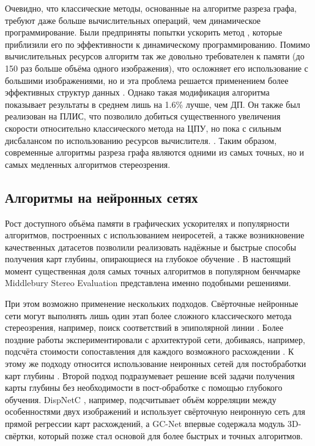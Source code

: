 Очевидно, что классические методы, основанные на алгоритме разреза графа, требуют даже больше вычислительных операций, чем динамическое программирование. Были предприняты попытки ускорить метод \cite{fast_gc,graphcut}, 
которые приблизили его по эффективности к динамическому программированию. Помимо вычислительных ресурсов алгоритм так же довольно требователен к памяти (до  150 раз больше объёма одного изображения), что осложняет его использование 
с большими изображениями, но и эта проблема решается применением более эффективных структур данных \cite{effic_gc}. Однако такая модификация алгоритма показывает результаты в среднем лишь на 1.6\%  лучше, чем ДП. Он также был реализован 
на ПЛИС, что позволило добиться существенного увеличения скорости относительно классического метода на ЦПУ, но пока с сильным дисбалансом по использованию ресурсов вычислителя. \cite{fpga_gc}.  
Таким образом, современные алгоритмы разреза графа являются одними из самых точных, но и самых медленных алгоритмов стереозрения. 

\subsection{Алгоритмы на нейронных сетях}

Рост доступного объёма памяти в графических ускорителях и популярности алгоритмов, построенных с использованием неиросетей, а также возникновение качественных датасетов позволили реализовать надёжные и быстрые способы 
получения карт глубины, опирающиеся на глубокое обучение \cite{neural_review}. В настоящий момент существенная доля самых точных алгоритмов в популярном бенчмарке Middlebury Stereo Evaluation \cite{stereo_bench} представлена именно
подобными решениями. 

При  этом возможно применение нескольких подходов. Свёрточные нейронные сети могут выполнять лишь один этап более сложного классического метода стереозрения, например, поиск соответствий в эпиполярной линии \cite{cnn_match}. Более поздние работы 
экспериментировали с архитектурой сети, добиваясь, например, подсчёта стоимости сопоставления для каждого возможного расхождении \cite{cnn_improv}.  К этому же подходу относится использование неиронных сетей для постобработки 
карт глубины \cite{cnn_post1}.  
Второй подход подразумевает решение всей задачи получения карты глубины без необходимости в пост-обработке с помощью глубокого обучения. DispNetC \cite{cnn_ete1}, например, подсчитывает объём корреляции между особенностями двух изображений и использует свёрточную неиронную сеть 
для прямой регрессии карт расхождений, а GC-Net \cite{gc_net} впервые содержала модуль 3D-свёртки, который позже стал основой для более быстрых и точных алгоритмов.   

